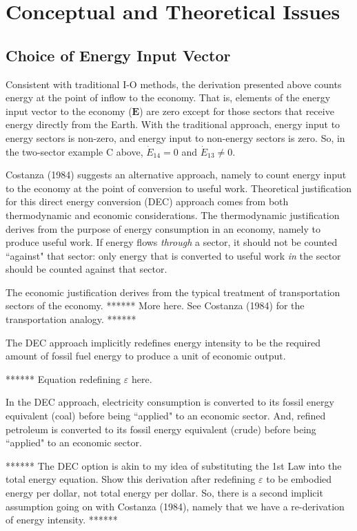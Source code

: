 \documentclass[authoryear,preprint,review,12pt]{elsarticle}
\renewcommand{\vec}[1]{\mathbf{#1}}
\begin{document}
\section{Conceptual and Theoretical Issues}


\subsection{Choice of Energy Input Vector}

Consistent with traditional I-O methods, the derivation presented above counts energy at the point of inflow to the economy. That is, elements of the energy input vector to the economy ($\vec{E}$) are zero except for those sectors that receive energy directly from the Earth. With the traditional approach, energy input to energy sectors is non-zero, and energy input to non-energy sectors is zero. So, in the two-sector example C above, $\dot{E}_{14} = 0$ and $\dot{E}_{13} \neq 0$. 

Costanza (1984) suggests an alternative approach, namely to count energy input to the economy at the point of conversion to useful work. Theoretical justification for this direct energy conversion (DEC) approach comes from both thermodynamic and economic considerations. The thermodynamic justification derives from the purpose of energy consumption in an economy, namely to produce useful work. If energy flows \emph{through} a sector, it should not be counted ``against" that sector: only energy that is converted to useful work \emph{in} the sector should be counted against that sector.

The economic justification derives from the typical treatment of transportation sectors of the economy. ****** More here. See Costanza (1984) for the transportation analogy. ******

The DEC approach implicitly redefines energy intensity to be the required amount of fossil fuel energy to produce a unit of economic output. 

****** Equation redefining $\varepsilon$ here.

In the DEC approach, electricity consumption is converted to its fossil energy equivalent (coal) before being ``applied" to an economic sector. And, refined petroleum is converted to its fossil energy equivalent (crude) before being ``applied" to an economic sector.

****** The DEC option is akin to my idea of substituting the 1st Law into the total energy equation. Show this derivation after redefining $\varepsilon$ to be embodied energy per dollar, not total energy per dollar. So, there is a second implicit assumption going on with Costanza (1984), namely that we have a re-derivation of energy intensity. ******
\end{document}
